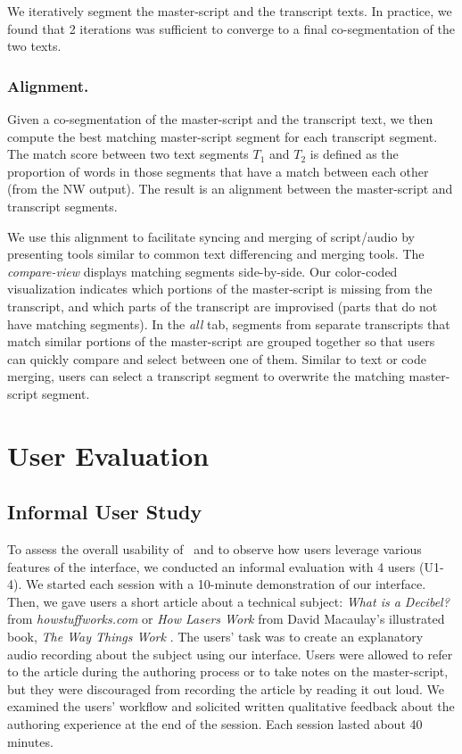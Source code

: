 We iteratively segment the master-script and the transcript texts. In practice, we found that 2 iterations was sufficient to converge to a final co-segmentation of the two texts.

\subsubsection{Alignment.} 
Given a co-segmentation of the master-script and the transcript text, we then compute the best matching master-script segment for each transcript segment. The match score between two text segments $T_1$ and $T_2$ is defined as the proportion of words in those segments that have a match between each other (from the NW output).
The result is an alignment between the master-script and transcript segments. 

We use this alignment to facilitate syncing and merging of script/audio by presenting tools similar to  common text differencing and merging tools. The \textit{compare-view} displays matching segments side-by-side. Our color-coded visualization indicates which portions of the master-script is missing from the transcript, and which parts of the transcript are improvised (parts that do not have matching segments). In the \textit{all} tab, segments from separate transcripts that match similar portions of the master-script are grouped together so that users can quickly compare and select between one of them. Similar to text or code merging, users can select a transcript segment to overwrite the matching master-script segment.



\section{User Evaluation}
\label{sec:usereval}
\subsection{Informal User Study}
To assess the overall usability of \voicescript\ and to observe how users leverage various features of the interface, we conducted an informal evaluation with 4 users (U1-4). We started each session with a 10-minute demonstration of our interface. Then, we gave users a short article about a technical subject: \textit{What
is a Decibel?} from \textit{howstuffworks.com} \cite{howstuffworks} or \textit{How Lasers Work} from
David Macaulay's illustrated book, \textit{The Way Things Work}
\cite{macaulay1999way}. The users' task was to create an explanatory audio recording about the subject using our interface. Users were allowed to refer to the article during the authoring process or to take notes on the master-script, but they were discouraged from recording the article by reading it out loud. We examined the users' workflow and solicited written qualitative feedback about the authoring experience at the end of the session. Each session lasted about 40 minutes.


